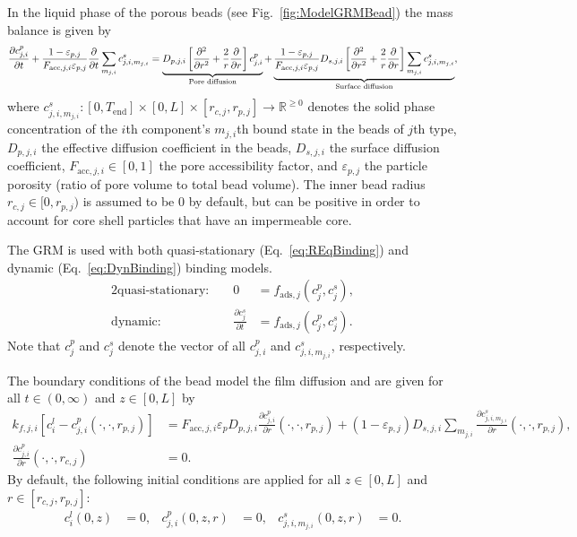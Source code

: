 In the liquid phase of the porous beads (see Fig.~\ref{fig:ModelGRMBead}) the mass balance is given by
\begin{align}
	\frac{\pdiff c^p_{j,i}}{\pdiff t} + \frac{1 - \varepsilon_{p,j}}{F_{\text{acc},j,i} \varepsilon_{p,j}} \frac{\pdiff}{\pdiff t} \sum_{m_{j,i}} c^s_{j,i,m_{j,i}} = \underbrace{D_{p,j,i} \left[\frac{\pdiff^2}{\pdiff r^2} + \frac{2}{r} \frac{\pdiff}{\pdiff r} \right]c^p_{j,i}}_{\text{Pore diffusion}} + \underbrace{\frac{1 - \varepsilon_{p,j}}{F_{\text{acc},j,i} \varepsilon_{p,j}} D_{s,j,i} \left[\frac{\pdiff^2}{\pdiff r^2} + \frac{2}{r} \frac{\pdiff }{\pdiff r} \right] \sum_{m_{j,i}} c^s_{j,i,m_{j,i}} }_{\text{Surface diffusion}}, \label{eq:ModelBead}
\end{align}
where $c^s_{j,i,m_{j,i}}\colon \left[0, T_{\text{end}}\right] \times [0,L] \times [r_{c,j}, r_{p,j}] \rightarrow \mathds{R}^{\geq 0}$ denotes the solid phase concentration of the $i$th component's $m_{j,i}$th bound state in the beads of $j$th type, $D_{p,j,i}$ the effective diffusion coefficient in the beads, $D_{s,j,i}$ the surface diffusion coefficient, $F_{\text{acc},j,i} \in [0,1]$ the pore accessibility factor, and $\varepsilon_{p,j}$ the particle porosity (ratio of pore volume to total bead volume).
The inner bead radius $r_{c,j} \in [0, r_{p,j})$ is assumed to be $0$ by default, but can be positive in order to account for core shell particles that have an impermeable core.

The GRM is used with both quasi-stationary (Eq.~\eqref{eq:REqBinding}) and dynamic (Eq.~\eqref{eq:DynBinding}) binding models. 
\begin{alignat}{2}
	\text{quasi-stationary: }& & 0 &= f_{\text{ads},j}\left( c^p_j, c^s_j\right), \label{eq:REqBinding} \\
	\text{dynamic: }& & \frac{\partial c^s_j}{\partial t} &= f_{\text{ads},j}\left( c^p_j, c^s_j\right). \label{eq:DynBinding}
\end{alignat}
Note that $c^p_j$ and $c^s_j$ denote the vector of all $c^p_{j,i}$ and $c^s_{j,i,m_{j,i}}$, respectively.

The boundary conditions of the bead model the film diffusion and are given for all ${t \in (0,\infty)}$ and $z \in [0,L]$ by
\begin{align}
	k_{f,j,i}\left[ c^l_i - c^p_{j,i}(\cdot, \cdot, r_{p,j}) \right] &= F_{\text{acc},j,i} \varepsilon_p D_{p,j,i} \frac{\partial c^p_{j,i}}{\partial r}(\cdot, \cdot, r_{p,j}) + \left( 1 - \varepsilon_{p,j}\right) D_{s,j,i} \sum_{m_{j,i}} \frac{\partial c^s_{j,i,m_{j,i}}}{\partial r}(\cdot, \cdot, r_{p,j}), \label{eq:BCBeadIn} \\
	\frac{\partial c^p_{j,i}}{\partial r}(\cdot, \cdot, r_{c,j}) &= 0. \label{eq:BCBeadCenter}
\end{align}
By default, the following initial conditions are applied for all $z \in [0,L]$ and $r \in \left[r_{c,j}, r_{p,j}\right]$:
\begin{align}
	c^l_i(0, z) &= 0, & c^p_{j,i}(0, z, r) &= 0, & c^s_{j,i,m_{j,i}}(0,z,r) &= 0. \label{eq:InitialConditions}
\end{align}

